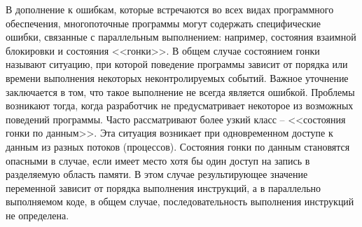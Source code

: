 


В дополнение к ошибкам, которые встречаются во всех видах программного обеспечения, многопоточные программы могут содержать специфические ошибки, связанные с параллельным выполнением: например, состояния взаимной блокировки и состояния <<гонки>>.
В общем случае состоянием гонки называют ситуацию, при которой поведение программы зависит от порядка или времени выполнения некоторых неконтролируемых событий.
Важное уточнение заключается в том, что такое выполнение не всегда является ошибкой.
Проблемы возникают тогда, когда разработчик не предусматривает некоторое из возможных поведений программы.
Часто рассматривают более узкий класс -- <<состояния гонки по данным>>. Эта ситуация возникает при одновременном доступе к данным из разных потоков (процессов).
Состояния гонки по данным становятся опасными в случае, если имеет место хотя бы один доступ на запись в разделяемую область памяти.
В этом случае результирующее значение переменной зависит от порядка выполнения инструкций, а в параллельно выполняемом коде, в общем случае, последовательность выполнения инструкций не определена. 

